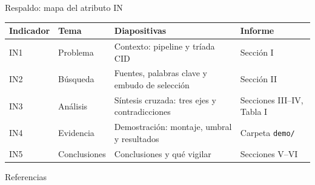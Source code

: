 
\begin{frame}{Respaldo: mapa del atributo IN}

  \vspace{0.1cm}
  \scriptsize
  \begin{tabularx}{\textwidth}{@{}l P{2.6cm} Y P{3.0cm}@{}}
    \toprule
    \textbf{Indicador} & \textbf{Tema} & \textbf{Diapositivas} &
    \textbf{Informe}\\
    \midrule
    IN1 & Problema & Contexto: pipeline y tr\'iada CID & Secci\'on I\\
    IN2 & B\'usqueda & Fuentes, palabras clave y embudo de selecci\'on &
      Secci\'on II\\
    IN3 & An\'alisis & S\'intesis cruzada: tres ejes y contradicciones &
      Secciones III--IV, Tabla I\\
    IN4 & Evidencia & Demostraci\'on: montaje, umbral y resultados &
      Carpeta \texttt{demo/}\\
    IN5 & Conclusiones & Conclusiones y qu\'e vigilar & Secciones V--VI\\
    \bottomrule
  \end{tabularx}
\end{frame}

\begin{frame}[allowframebreaks]{Referencias}
  \tiny
  
  
\end{frame}